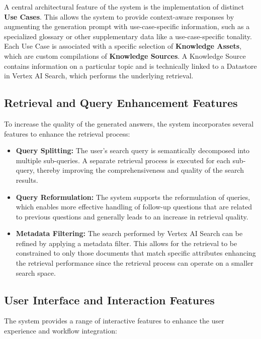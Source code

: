 \documentclass[
	english,
	ruledheaders=section,%
	class=report,%
	thesis={type=bachelor},%
	accentcolor=1b,%
	custommargins=true,%
	marginpar=false,%
	parskip=half-,%
	fontsize=11pt,%
	DIV=14,
]{tudapub}
\begin{document}
A central architectural feature of the system is the implementation of distinct \textbf{Use Cases}. This allows the system to provide context-aware responses by augmenting the generation prompt with use-case-specific information, such as a specialized glossary or other supplementary data like a use-case-specific tonality. Each Use Case is associated with a specific selection of \textbf{Knowledge Assets}, which are custom compilations of \textbf{Knowledge Sources}. A Knowledge Source contains information on a particular topic and is technically linked to a Datastore in Vertex AI Search, which performs the underlying retrieval.

\subsection{Retrieval and Query Enhancement Features}
To increase the quality of the generated answers, the system incorporates several features to enhance the retrieval process:

\begin{itemize}
    \item \textbf{Query Splitting:} The user's search query is semantically decomposed into multiple sub-queries. A separate retrieval process is executed for each sub-query, thereby improving the comprehensiveness and quality of the search results.
    
    \item \textbf{Query Reformulation:} The system supports the reformulation of queries, which enables more effective handling of follow-up questions that are related to previous questions and generally leads to an increase in retrieval quality.
    
    \item \textbf{Metadata Filtering:} The search performed by Vertex AI Search can be refined by applying a metadata filter. This allows for the retrieval to be constrained to only those documents that match specific attributes enhancing the retrieval performance since the retrieval process can operate on a smaller search space.
\end{itemize}

\subsection{User Interface and Interaction Features}
The system provides a range of interactive features to enhance the user experience and workflow integration:
\end{document}
